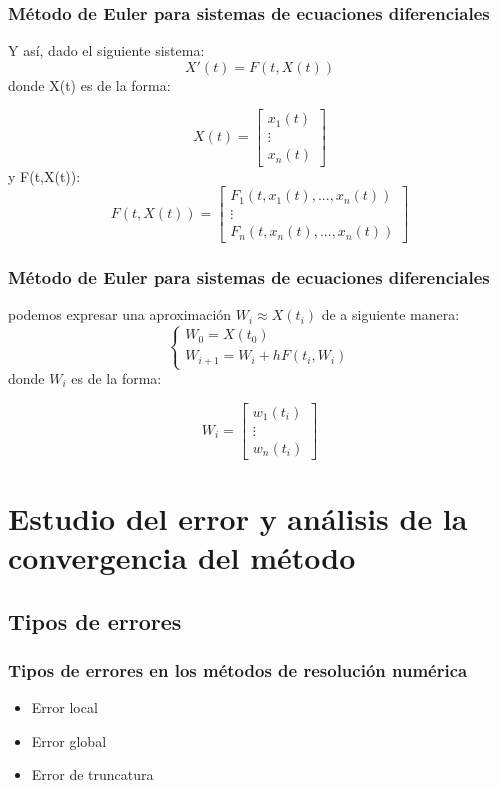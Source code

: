 \documentclass{beamer}
\begin{document}
\begin{frame}
	\frametitle{Método de Euler para sistemas de ecuaciones diferenciales}
	
	Y así, dado el siguiente sistema: $$
	X'(t)=F(t,X(t))
	$$
	donde X(t) es de la forma:
	
	\begin{equation*}
	X(t)=\begin{bmatrix}
	x_1(t) \\
	\vdots \\
	x_n(t)
	\end{bmatrix}
	\end{equation*}
	y F(t,X(t)):
	\begin{equation*}
	F(t,X(t))=\begin{bmatrix}
	F_1(t,x_1(t),...,x_n(t)) \\
	\vdots \\
	F_n(t,x_n(t),...,x_n(t))
	\end{bmatrix}
	\end{equation*}
	
	
	 
\end{frame}

\begin{frame}
	\frametitle{Método de Euler para sistemas de ecuaciones diferenciales}
	
	podemos expresar una aproximación $W_i \approx X(t_i)$ de a siguiente manera:
	$$
	\begin{cases}
	W_0=X(t_0)\\
	W_{i+1}=W_i + hF(t_i,W_i)
	\end{cases}
	$$
	donde $W_i$ es de la forma:
	
	\begin{equation*}
	W_i=\begin{bmatrix}
	w_1(t_i) \\
	\vdots \\
	w_n(t_i)
	\end{bmatrix}
	\end{equation*}
	
	
\end{frame}

\section{Estudio del error y análisis de la convergencia del método}

\subsection{Tipos de errores}
\begin{frame}
	\frametitle{Tipos de errores en los métodos de resolución numérica}

	\begin{itemize}
	\item Error local
	\item Error global
	\item Error de truncatura
	\end{itemize}

\end{frame}
\end{document}
